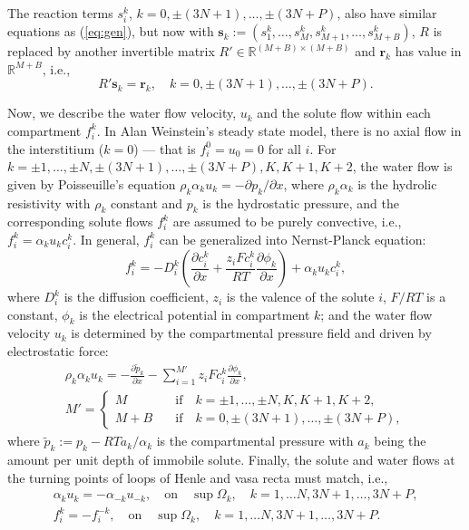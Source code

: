 \documentclass{article}
\begin{document}
The reaction terms $s_i^k$, $k=0,\pm(3N+1),\dots,\pm(3N+P)$, also have similar equations as (\ref{eq:gen}), but now with $\mathbf{s}_k:=(s_1^k,\dots,s_M^k,s_{M+1}^k,\dots,s_{M+B}^k)$, $R$ is replaced by another invertible matrix $R'\in \mathbb{R}^{(M+B)\times (M+B)}$ and $\mathbf{r}_k$ has value in $\mathbb{R}^{M+B}$, i.e.,
\begin{equation}
    R'\mathbf{s}_k=\mathbf{r}_k,\quad k=0,\pm(3N+1),\dots,\pm(3N+P).
\end{equation}

Now, we describe the water flow velocity, $u_k$ and the solute flow within each compartment $f_i^k$.
In Alan Weinstein's steady state model, there is no axial flow in the interstitium ($k=0$) --- that is $f_i^0=u_0=0$ for all $i$.
For $k=\pm 1,\dots,\pm N,\pm(3N+1),\dots,\pm(3N+P),K,K+1,K+2$, 
the water flow is given by Poisseuille's equation $\rho_k\alpha_ku_k = -\partial p_k/\partial x$, where $\rho_k\alpha_k$ is the hydrolic resistivity with $\rho_k$ constant and $p_k$ is the hydrostatic pressure, and the corresponding solute flows 
$f_i^k$ are assumed to be purely convective, i.e., $f_i^k = \alpha_ku_kc_i^k$.
In general, $f_i^k$ can be generalized into Nernst-Planck equation:
\begin{equation}
    f_i^k = -D_i^k\left( \frac{\partial c_i^k}{\partial x}+\frac{z_iFc_i^k}{RT} \frac{\partial\phi_k}{\partial x}\right) + \alpha_k u_kc_i^k,
\end{equation}
where $D_i^k$ is the diffusion coefficient, $z_i$ is the valence of the solute $i$, $F/RT$ is a constant, $\phi_k$ is the electrical potential in compartment $k$;
and the water flow velocity $u_k$
is determined by the compartmental pressure field and driven by electrostatic force:
\begin{gather}
    \rho_k\alpha_k u_k = -\frac{\partial \tilde{p}_k}{\partial x} - \sum_{i=1}^{M'}z_iFc_i^k\frac{\partial \phi_k}{\partial x},\\
    M'=\begin{cases}
        M&\quad \text{if}\quad k=\pm 1,\dots,\pm N,K,K+1,K+2,\\
        M+B &\quad \text{if}\quad k=0,\pm(3N+1),\dots,\pm(3N+P),
    \end{cases}\nonumber
\end{gather}
where $\tilde{ p }_k:= p_k-RTa_k/\alpha_k$ is the compartmental pressure with $a_k$ being the amount per unit depth of immobile solute.
Finally, the solute and water flows at the turning points of loops of Henle and vasa recta must match, i.e.,
\begin{align}
    \alpha_ku_k = -\alpha_{-k}u_{-k},\quad\text{on}\quad\sup\Omega_k,\quad k= 1,\dots N,3N+1,\dots,3N+P,\\
    f_i^k = -f_i^{-k},\quad\text{on}\quad\sup\Omega_k,\quad k= 1,\dots N,3N+1,\dots,3N+P.
\end{align}
\end{document}
